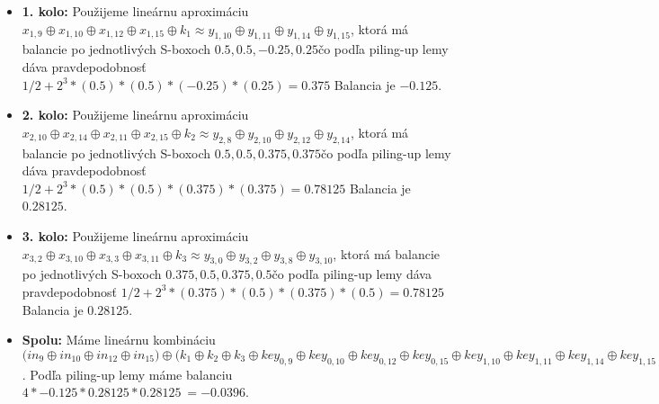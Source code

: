 \begin{itemize}
\item {\bf 1. kolo:}
Použijeme lineárnu aproximáciu $
x_{1,9} \oplus x_{1,10} \oplus x_{1,12} \oplus x_{1,15}  \oplus k_{1} 
 \approx 
y_{1,10} \oplus y_{1,11} \oplus y_{1,14} \oplus y_{1,15} $,
ktorá má balancie po jednotlivých S-boxoch $
0.5,0.5,-0.25,0.25
$čo podľa piling-up lemy dáva pravdepodobnosť 
$1/2 + 2^3*( 0.5)*(0.5)*(-0.25)*(0.25 )= 0.375 $
Balancia je $-0.125$.

\item {\bf 2. kolo:}
Použijeme lineárnu aproximáciu $
x_{2,10} \oplus x_{2,14} \oplus x_{2,11} \oplus x_{2,15}  \oplus k_{2} 
 \approx 
y_{2,8} \oplus y_{2,10} \oplus y_{2,12} \oplus y_{2,14} $,
ktorá má balancie po jednotlivých S-boxoch $
0.5,0.5,0.375,0.375
$čo podľa piling-up lemy dáva pravdepodobnosť 
$1/2 + 2^3*( 0.5)*(0.5)*(0.375)*(0.375 )= 0.78125 $
Balancia je $0.28125$.

\item {\bf 3. kolo:}
Použijeme lineárnu aproximáciu $
x_{3,2} \oplus x_{3,10} \oplus x_{3,3} \oplus x_{3,11}  \oplus k_{3} 
 \approx 
y_{3,0} \oplus y_{3,2} \oplus y_{3,8} \oplus y_{3,10} $,
ktorá má balancie po jednotlivých S-boxoch $
0.375,0.5,0.375,0.5
$čo podľa piling-up lemy dáva pravdepodobnosť 
$1/2 + 2^3*( 0.375)*(0.5)*(0.375)*(0.5 )= 0.78125 $
Balancia je $0.28125$.

\item {\bf Spolu:}  Máme lineárnu kombináciu $ \Big(
in_{9} \oplus in_{10} \oplus in_{12} \oplus in_{15}
\Big) \oplus \Big( k_1 \oplus k_2 \oplus k_3 \oplus 
key_{0,9} \oplus key_{0,10} \oplus key_{0,12} \oplus key_{0,15} \oplus key_{1,10} \oplus key_{1,11} \oplus key_{1,14} \oplus key_{1,15} \oplus key_{2,2} \oplus key_{2,3} \oplus key_{2,10} \oplus key_{2,11} \oplus key_{3,0} \oplus key_{3,2} \oplus key_{3,8} \oplus key_{3,10} \Big) \approx \Big(
out_{0} \oplus out_{2} \oplus out_{8} \oplus out_{10}
\Big) $.
Podľa piling-up lemy máme balanciu $4* -0.125*0.28125*0.28125 ~= -0.0396 $.
\end{itemize}
